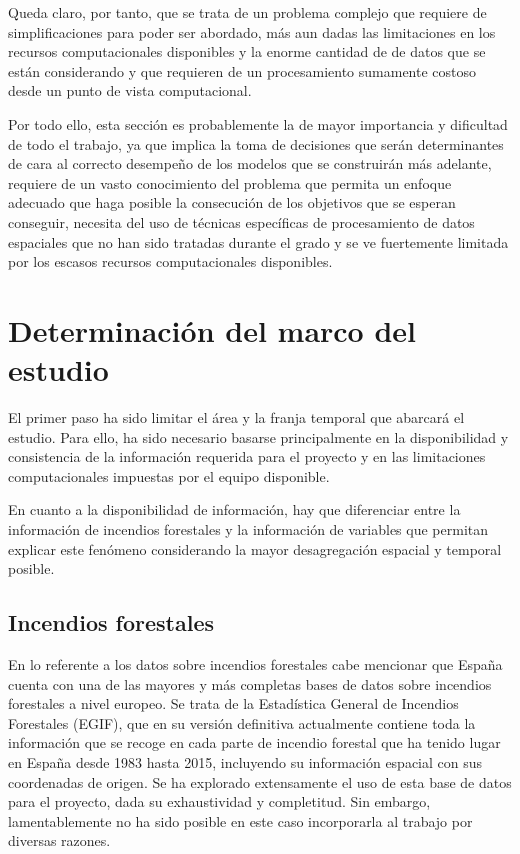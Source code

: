 \documentclass[12pt,a4paper,]{book}
\numberwithin{dummy}{section}
\theoremstyle{ocrenumbox}
\theoremstyle{blacknumex}
\theoremstyle{blacknumbox}
\theoremstyle{ocrenum}
\theoremstyle{ocrenum}
\begin{document}
Queda claro, por tanto, que se trata de un problema complejo que
requiere de simplificaciones para poder ser abordado, más aun dadas las
limitaciones en los recursos computacionales disponibles y la enorme
cantidad de de datos que se están considerando y que requieren de un
procesamiento sumamente costoso desde un punto de vista computacional.

Por todo ello, esta sección es probablemente la de mayor importancia y
dificultad de todo el trabajo, ya que implica la toma de decisiones que
serán determinantes de cara al correcto desempeño de los modelos que se
construirán más adelante, requiere de un vasto conocimiento del problema
que permita un enfoque adecuado que haga posible la consecución de los
objetivos que se esperan conseguir, necesita del uso de técnicas
específicas de procesamiento de datos espaciales que no han sido
tratadas durante el grado y se ve fuertemente limitada por los escasos
recursos computacionales disponibles.

\hypertarget{determinaciuxf3n-del-marco-del-estudio}{%
\section{Determinación del marco del
estudio}\label{determinaciuxf3n-del-marco-del-estudio}}

El primer paso ha sido limitar el área y la franja temporal que abarcará
el estudio. Para ello, ha sido necesario basarse principalmente en la
disponibilidad y consistencia de la información requerida para el
proyecto y en las limitaciones computacionales impuestas por el equipo
disponible.

En cuanto a la disponibilidad de información, hay que diferenciar entre
la información de incendios forestales y la información de variables que
permitan explicar este fenómeno considerando la mayor desagregación
espacial y temporal posible.

\hypertarget{incendios-forestales}{%
\subsection{Incendios forestales}\label{incendios-forestales}}

En lo referente a los datos sobre incendios forestales cabe mencionar
que España cuenta con una de las mayores y más completas bases de datos
sobre incendios forestales a nivel europeo. Se trata de la Estadística
General de Incendios Forestales (EGIF), que en su versión definitiva
actualmente contiene toda la información que se recoge en cada parte de
incendio forestal que ha tenido lugar en España desde 1983 hasta 2015,
incluyendo su información espacial con sus coordenadas de origen. Se ha
explorado extensamente el uso de esta base de datos para el proyecto,
dada su exhaustividad y completitud. Sin embargo, lamentablemente no ha
sido posible en este caso incorporarla al trabajo por diversas razones.
\end{document}
